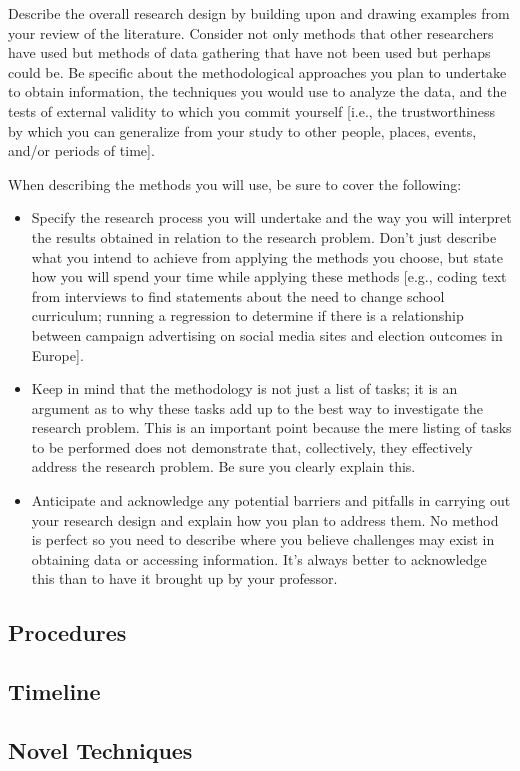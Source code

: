 \documentclass[10pt,twocolumn,letterpaper]{article}
\begin{document}
Describe the overall research design by building upon and drawing examples from your review of the literature. Consider not only methods that other researchers have used but methods of data gathering that have not been used but perhaps could be. Be specific about the methodological approaches you plan to undertake to obtain information, the techniques you would use to analyze the data, and the tests of external validity to which you commit yourself [i.e., the trustworthiness by which you can generalize from your study to other people, places, events, and/or periods of time].

When describing the methods you will use, be sure to cover the following:
\begin{itemize}
    \item Specify the research process you will undertake and the way you will interpret the results obtained in relation to the research problem. Don't just describe what you intend to achieve from applying the methods you choose, but state how you will spend your time while applying these methods [e.g., coding text from interviews to find statements about the need to change school curriculum; running a regression to determine if there is a relationship between campaign advertising on social media sites and election outcomes in Europe].
    \item Keep in mind that the methodology is not just a list of tasks; it is an argument as to why these tasks add up to the best way to investigate the research problem. This is an important point because the mere listing of tasks to be performed does not demonstrate that, collectively, they effectively address the research problem. Be sure you clearly explain this.
    \item Anticipate and acknowledge any potential barriers and pitfalls in carrying out your research design and explain how you plan to address them. No method is perfect so you need to describe where you believe challenges may exist in obtaining data or accessing information. It's always better to acknowledge this than to have it brought up by your professor.
    \end{itemize}
\subsection{Procedures}
\subsection{Timeline}
\subsection{Novel Techniques}
\end{document}
